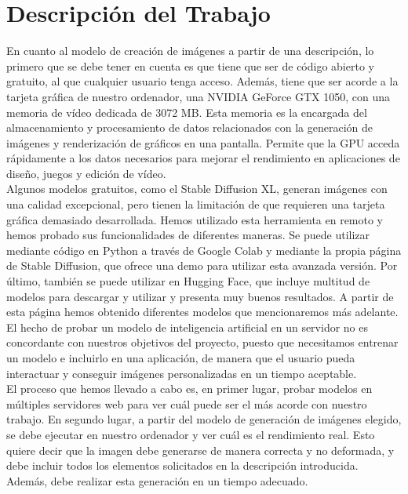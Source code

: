 \chapter{Descripción del Trabajo}
\label{cap:descripcionTrabajo}

En cuanto al modelo de creación de imágenes a partir de una descripción, lo primero que se debe tener en cuenta es que tiene que ser de código abierto y gratuito, al que cualquier usuario tenga acceso. Además, tiene que ser acorde a la tarjeta gráfica de nuestro ordenador, una NVIDIA GeForce GTX 1050, con una memoria de vídeo dedicada de 3072 MB. Esta memoria es la encargada del almacenamiento y procesamiento de datos relacionados con la generación de imágenes y renderización de gráficos en una pantalla. Permite que la GPU acceda rápidamente a los datos necesarios para mejorar el rendimiento en aplicaciones de diseño, juegos y edición de vídeo.\\

Algunos modelos gratuitos, como el Stable Diffusion XL, generan imágenes con una calidad excepcional, pero tienen la limitación de que requieren una tarjeta gráfica demasiado desarrollada. Hemos utilizado esta herramienta en remoto y hemos probado sus funcionalidades de diferentes maneras. Se puede utilizar mediante código en Python a través de Google Colab y mediante la propia página de Stable Diffusion, que ofrece una demo para utilizar esta avanzada versión. Por último, también se puede utilizar en Hugging Face, que incluye multitud de modelos para descargar y utilizar y presenta muy buenos resultados. A partir de esta página hemos obtenido diferentes modelos que mencionaremos más adelante.\\

El hecho de probar un modelo de inteligencia artificial en un servidor no es concordante con nuestros objetivos del proyecto, puesto que necesitamos entrenar un modelo e incluirlo en una aplicación, de manera que el usuario pueda interactuar y conseguir imágenes personalizadas en un tiempo aceptable.\\

El proceso que hemos llevado a cabo es, en primer lugar, probar modelos en múltiples servidores web para ver cuál puede ser el más acorde con nuestro trabajo. 
En segundo lugar, a partir del modelo de generación de imágenes elegido, se debe ejecutar en nuestro ordenador y ver cuál es el rendimiento real. Esto quiere decir que la imagen debe generarse de manera correcta y no deformada, y debe incluir todos los elementos solicitados en la descripción introducida. Además, debe realizar esta generación en un tiempo adecuado.\\

